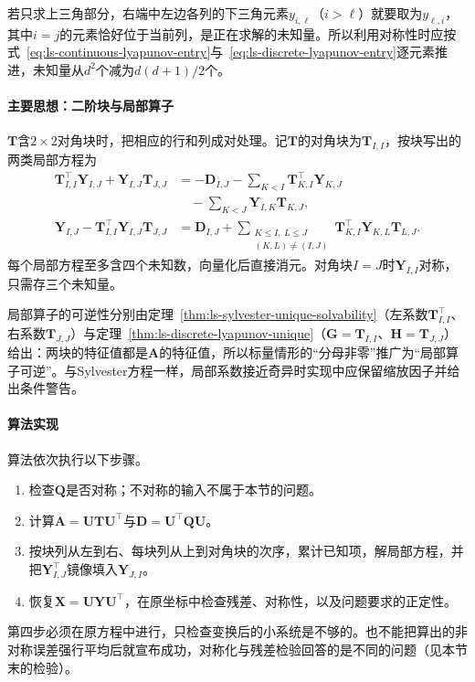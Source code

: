 若只求上三角部分，右端中左边各列的下三角元素$y_{i,\ell}$（$i>\ell$）就要取为$y_{\ell,i}$，其中$i=j$的元素恰好位于当前列，是正在求解的未知量。所以利用对称性时应按式~\eqref{eq:ls-continuous-lyapunov-entry}与~\eqref{eq:ls-discrete-lyapunov-entry}逐元素推进，未知量从$d^2$个减为$d(d+1)/2$个。

\paragraph{主要思想：二阶块与局部算子}
$\bm T$含$2\times2$对角块时，把相应的行和列成对处理。记$\bm T$的对角块为$\bm T_{I,I}$，按块写出的两类局部方程为
\begin{equation}
 \begin{aligned}
 \bm T_{I,I}^\top\bm Y_{I,J}+\bm Y_{I,J}\bm T_{J,J}
 &=-\bm D_{I,J}-\sum_{K<I}\bm T_{K,I}^\top\bm Y_{K,J}\\
 &\quad-\sum_{K<J}\bm Y_{I,K}\bm T_{K,J},\\
 \bm Y_{I,J}-\bm T_{I,I}^\top\bm Y_{I,J}\bm T_{J,J}
 &=\bm D_{I,J}+\sum_{\substack{K\leq I,\ L\leq J\\(K,L)\neq(I,J)}}\bm T_{K,I}^\top\bm Y_{K,L}\bm T_{L,J}.
 \end{aligned}
 \label{eq:ls-lyapunov-block-recursion}
\end{equation}
每个局部方程至多含四个未知数，向量化后直接消元。对角块$I=J$时$\bm Y_{I,I}$对称，只需存三个未知量。

局部算子的可逆性分别由定理~\ref{thm:ls-sylvester-unique-solvability}（左系数$\bm T_{I,I}^\top$、右系数$\bm T_{J,J}$）与定理~\ref{thm:ls-discrete-lyapunov-unique}（$\bm G=\bm T_{I,I}$、$\bm H=\bm T_{J,J}$）给出：两块的特征值都是$\bm A$的特征值，所以标量情形的“分母非零”推广为“局部算子可逆”。与Sylvester方程一样，局部系数接近奇异时实现中应保留缩放因子并给出条件警告。

\paragraph{算法实现}
算法依次执行以下步骤。
\begin{enumerate}
 \item 检查$\bm Q$是否对称；不对称的输入不属于本节的问题。
 \item 计算$\bm A=\bm U\bm T\bm U^\top$与$\bm D=\bm U^\top\bm Q\bm U$。
 \item 按块列从左到右、每块列从上到对角块的次序，累计已知项，解局部方程，并把$\bm Y_{I,J}^\top$镜像填入$\bm Y_{J,I}$。
 \item 恢复$\bm X=\bm U\bm Y\bm U^\top$，在原坐标中检查残差、对称性，以及问题要求的正定性。
\end{enumerate}
第四步必须在原方程中进行，只检查变换后的小系统是不够的。也不能把算出的非对称误差强行平均后就宣布成功，对称化与残差检验回答的是不同的问题（见本节末的检验）。

